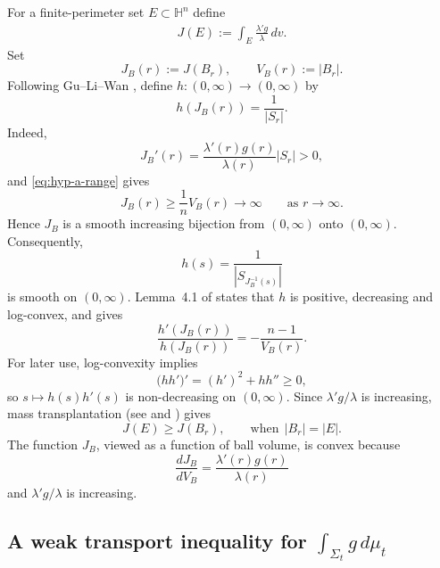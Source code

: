 \documentclass[10pt,a4paper]{amsart}
\numberwithin{equation}{section}
\newcommand{\dd}{\,d}
\newcommand{\HH}{\mathbb H}
\begin{document}
For a finite-perimeter set $E\subset\HH^n$ define
\begin{align*}
    J(E):=\int_E\frac{\lambda'g}{\lambda}\,dv.
\end{align*}
 Set
\begin{equation*}
    J_B(r):=J(B_r),
    \qquad
    V_B(r):=|B_r|.
\end{equation*}
Following Gu--Li--Wan \cite[\S 4.1]{GuLiWan2025}, define $h:(0,\infty)\to(0,\infty)$ by
\begin{equation*}
    h(J_B(r))=\frac1{|S_r|}.
\end{equation*}
Indeed,
\begin{equation*}
    J_B'(r)
    =\frac{\lambda'(r)g(r)}{\lambda(r)}|S_r|>0,
\end{equation*}
and \eqref{eq:hyp-a-range} gives
\begin{equation*}
    J_B(r)\geq\frac1nV_B(r)\longrightarrow\infty
    \qquad\text{as }r\to\infty.
\end{equation*}
Hence $J_B$ is a smooth increasing bijection from $(0,\infty)$ onto
$(0,\infty)$. Consequently,
\begin{equation*}
    h(s)=\frac{1}{\left|S_{J_B^{-1}(s)}\right|}
\end{equation*}
is smooth on $(0,\infty)$. Lemma~4.1 of \cite{GuLiWan2025} states that $h$ is positive, decreasing and log-convex, and gives
\begin{equation}\label{eq:hyp-h-log-derivative}
    \frac{h'(J_B(r))}{h(J_B(r))}
    =-\frac{n-1}{V_B(r)}.
\end{equation}
For later use, log-convexity implies
\begin{equation}\label{eq:hyp-hhprime-monotone}
    \bigl(hh'\bigr)'=(h')^2+hh''\geq0,
\end{equation}
so $s\mapsto h(s)h'(s)$ is non-decreasing on $(0,\infty)$. Since $\lambda'g/\lambda$ is increasing, mass transplantation (see \cite[\S 4]{FL21} and \cite{We56}) gives
\begin{equation}\label{eq:hyp-J-mass-transplant}
    J(E)\geq J(B_r),
    \qquad \text{when}~~ |B_r|=|E|.
\end{equation}
The function $J_B$, viewed as a function of ball volume, is convex because
\begin{equation*}
    \frac{dJ_B}{dV_B}=\frac{\lambda'(r)g(r)}{\lambda(r)}
\end{equation*}
and $\lambda'g/\lambda$ is increasing.

\subsection{A weak transport inequality for \texorpdfstring{$\int_{\Sigma_t}g\dd\mu_t$}{int Sigma g}}
\end{document}
